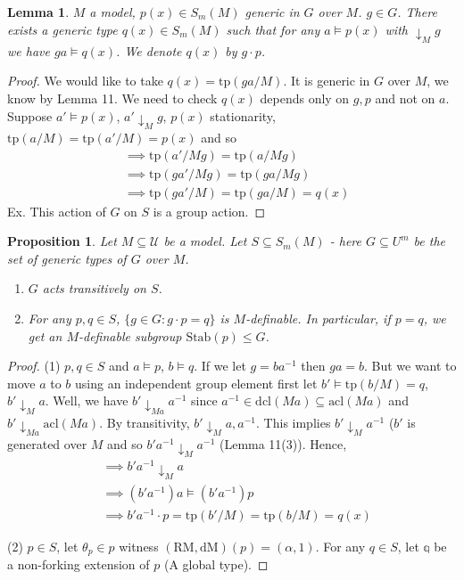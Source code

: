 \documentclass[letterpaper, 12pt]{article}
\newcommand{\cU}{\mathcal{U}}
\newcommand{\bq}{\mathbb{q}}
\newcommand{\tp}{\mbox{tp}}
\newcommand{\RM}{\mbox{RM}}
\newcommand{\dM}{\mbox{dM}}
\newcommand{\acl}{\mbox{acl}}
\newcommand{\dcl}{\mbox{dcl}}
\newcommand{\da}{\downarrow}
\theoremstyle{stdthm}
\newtheorem{lem}[thm]{Lemma}
\newtheorem{prop}[thm]{Proposition}
\theoremstyle{stddef}
\theoremstyle{stdnonum}
\theoremstyle{stdqands}
\theoremstyle{stdbold}
\begin{document}
\begin{lem}
$M$ a model, $p(x) \in S_m(M)$ generic in $G$ over $M$. $g \in G$. There exists a generic type $q(x) \in S_m(M)$ such that for any $a \models p(x)$ with $ \da_M g$ we have $ga \models q(x)$. We denote $q(x)$ by $g\cdot p$. 
\end{lem}

\begin{proof}
We would like to take $q(x) = \tp(ga/M)$. It is generic in $G$ over $M$, we know by Lemma 11. We need to check $q(x)$ depends only on $g,p$ and not on $a$.  \\

Suppose $a' \models p(x)$, $a' \da_M g$, $p(x)$ stationarity, $\tp(a/M) = \tp(a'/M) = p(x)$ and so 
\begin{align}
&\implies \tp(a'/Mg) = \tp(a/Mg) \\
&\implies \tp(ga'/Mg) = \tp(ga/Mg) \\
&\implies \tp(ga'/M) = \tp(ga/M) = q(x) 
\end{align}
Ex. This action of $G$ on $S$ is a group action. 
\end{proof}



\begin{prop}
Let $M\subseteq \cU$ be a model. Let $S \subseteq S_m(M)$ - here $G \subseteq U^m$ be the set of generic types of $G$ over $M$. 
\begin{enumerate}
\item $G$ acts transitively on $S$. 
\item For any $p,q \in S$, $\{g \in G: g\cdot p = q\}$ is $M$-definable. In particular, if $p=q$, we get an $M$-definable subgroup $\mbox{Stab}(p) \leq G$. 
\end{enumerate}
\end{prop}

\begin{proof}
(1) $p,q \in S$ and $a \models p$, $b \models q$. If we let $g = ba^{-1}$ then $ga = b$. But we want to move $a$ to $b$ using an independent group element first let $b'\models \tp(b/M) = q$, $b'\da_M a$.  Well, we have $b' \da_{Ma} a^{-1}$ since $a^{-1} \in \dcl(Ma) \subseteq \acl(Ma)$ and $b' \da_{Ma} \acl(Ma)$. By transitivity, $b' \da_M a,a^{-1}$. This implies $b' \da_M a^{-1}$ ($b'$ is generated over $M$ and so $b'a^{-1} \da_M a^{-1}$ (Lemma 11(3)). Hence,
\begin{align*}
&\implies b'a^{-1} \da_M a \\
&\implies (b'a^{-1})a \models (b'a^{-1}) p \\
&\implies b'a^{-1} \cdot p = \tp(b'/M) = \tp(b/M) = q(x) 
\end{align*}


\noindent (2) $p \in S$, let $\theta_p \in p$ witness  $(\RM,\dM)(p) = (\alpha,1)$. For any $q \in S$, let $\bq$ be a non-forking extension of $p$ (A global type). 
\end{proof}
\end{document}
